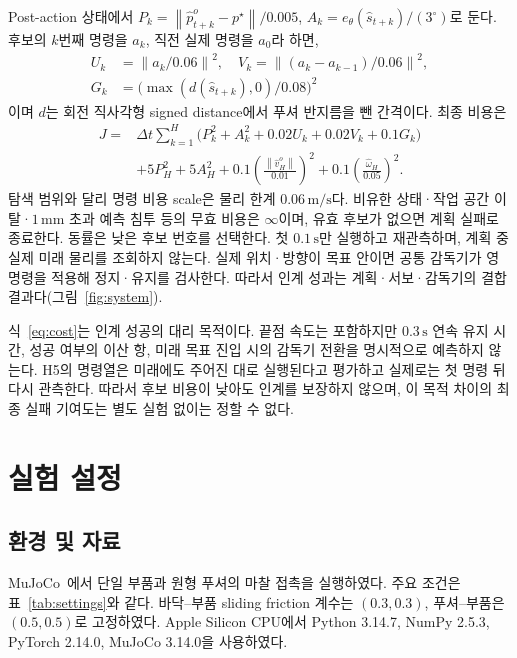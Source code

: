 \documentclass[conference,a4paper]{IEEEtran}
\newcommand{\norm}[1]{\left\lVert#1\right\rVert}
\begin{document}
Post-action 상태에서 $P_k=\norm{\hat p^o_{t+k}-p^\star}/0.005$,
$A_k=e_\theta(\hat s_{t+k})/(3^\circ)$로 둔다.
후보의 $k$번째 명령을 $a_k$, 직전 실제 명령을 $a_0$라 하면,
\begin{align}
U_k&=\norm{a_k/0.06}^2,\quad
V_k=\norm{(a_k-a_{k-1})/0.06}^2,\nonumber\\
G_k&=\big(\max(d(\hat s_{t+k}),0)/0.08\big)^2 \label{eq:terms}
\end{align}
이며 $d$는 회전 직사각형 signed distance에서 푸셔 반지름을 뺀 간격이다.
최종 비용은
\begin{align}
J={}&\Delta t\sum_{k=1}^{H}
\big(P_k^2+A_k^2+0.02U_k+0.02V_k+0.1G_k\big)\nonumber\\
&+5P_H^2+5A_H^2
+0.1\left(\frac{\norm{\hat v_H^o}}{0.01}\right)^2
+0.1\left(\frac{\hat\omega_H}{0.05}\right)^2 .
\label{eq:cost}
\end{align}
탐색 범위와 달리 명령 비용 scale은 물리 한계 $0.06\,\mathrm{m/s}$다.
비유한 상태·작업 공간 이탈·$1\,\mathrm{mm}$ 초과 예측 침투 등의 무효 비용은 $\infty$이며, 유효 후보가 없으면 계획 실패로 종료한다.
동률은 낮은 후보 번호를 선택한다.
첫 $0.1\,\mathrm{s}$만 실행하고 재관측하며, 계획 중 실제 미래 물리를 조회하지 않는다.
실제 위치·방향이 목표 안이면 공통 감독기가 영 명령을 적용해 정지·유지를 검사한다.
따라서 인계 성과는 계획·서보·감독기의 결합 결과다(그림~\ref{fig:system}).

식~\eqref{eq:cost}는 인계 성공의 대리 목적이다.
끝점 속도는 포함하지만 $0.3\,\mathrm s$ 연속 유지 시간, 성공 여부의 이산 항, 미래 목표 진입 시의 감독기 전환을 명시적으로 예측하지 않는다.
H5의 명령열은 미래에도 주어진 대로 실행된다고 평가하고 실제로는 첫 명령 뒤 다시 관측한다.
따라서 후보 비용이 낮아도 인계를 보장하지 않으며, 이 목적 차이의 최종 실패 기여도는 별도 실험 없이는 정할 수 없다.

\section{실험 설정}\label{sec:experiments}
\subsection{환경 및 자료}
MuJoCo~\cite{mujoco}에서 단일 부품과 원형 푸셔의 마찰 접촉을 실행하였다.
주요 조건은 표~\ref{tab:settings}와 같다.
바닥--부품 sliding friction 계수는 $(0.3,0.3)$, 푸셔--부품은 $(0.5,0.5)$로 고정하였다.
Apple Silicon CPU에서 Python 3.14.7, NumPy 2.5.3, PyTorch 2.14.0, MuJoCo 3.14.0을 사용하였다.
\end{document}
